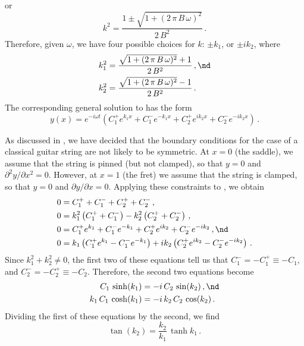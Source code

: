 or
 \begin{equation}
k^2 = \frac{1 \pm \sqrt{1 + (2\, \pi\, B\, \omega)^2}}{2\, B^2}\, .
 \end{equation}
Therefore, given $\omega$, we have four possible choices for $k$: $\pm k_1$, or $\pm i k_2$, where
 \begin{subequations} \label{eqn:disp_eqns}
 \begin{align}
\label{eqn:disp_eqn_1} k_1^2 &= \frac{\sqrt{1 + (2\, \pi\, B\, \omega)^2} + 1}{2\, B^2}\, , \nd \\
\label{eqn:disp_eqn_2} k_2^2 &= \frac{\sqrt{1 + (2\, \pi\, B\, \omega)^2} - 1}{2\, B^2}\, .
 \end{align}
 \end{subequations}
The corresponding general solution to  has the form
 \begin{equation} \label{eqn:soln_dim}
y(x) = e^{-i \omega t} \left( C_1^+ e^{k_1 x} + C_1^- e^{-k_1 x} + C_2^+ e^{i k_2 x} + C_2^- e^{-i k_2 x} \right)\, .
 \end{equation}

As discussed in , we have decided that the boundary conditions for the case of a classical guitar string are not likely to be symmetric. At $x = 0$ (the saddle), we assume that the string is pinned (but not clamped), so that $y = 0$ and $\partial^2 y/\partial x^2 = 0$. However, at $x = 1$ (the fret) we assume that the string is clamped, so that $y = 0$ and $\partial y/\partial x = 0$. Applying these constraints to , we obtain
 \begin{subequations}
 \begin{align}
  0 &= C_1^+ + C_1^- + C_2^+ + C_2^-\, , \\
  0 &= k_1^2 \left(C_1^+ + C_1^-\right) - k_2^2 \left(C_2^+ + C_2^-\right)\, , \\
  0 &= C_1^+ e^{k_1} + C_1^- e^{-k_1} + C_2^+ e^{i k_2} + C_2^- e^{-i k_2}\, , \nd \\
  0 &= k_1 \left(C_1^+ e^{k_1} - C_1^- e^{-k_1}\right) + i k_2 \left(C_2^+ e^{i k_2} - C_2^- e^{-i k_2}\right)\, .
 \end{align}
 \end{subequations}
Since $k_1^2 + k_2^2 \ne 0$, the first two of these equations tell us that $C_1^- = -C_1^+ \equiv -C_1$, and $C_2^- = -C_2^+ \equiv -C_2$. Therefore, the second two equations become
 \begin{subequations}
 \begin{align}
C_1\, \sinh(k_1) &= - i\, C_2\, \sin(k_2)\, , \nd \\
k_1\, C_1\, \cosh(k_1) &= -i\, k_2\, C_2\, \cos(k_2)\, .
 \end{align}
 \end{subequations}
Dividing the first of these equations by the second, we find
 \begin{equation} \label{eqn:tran_eqn_12}
\tan(k_2) = \frac{k_2}{k_1}\, \tanh{k_1}\, .
 \end{equation}

